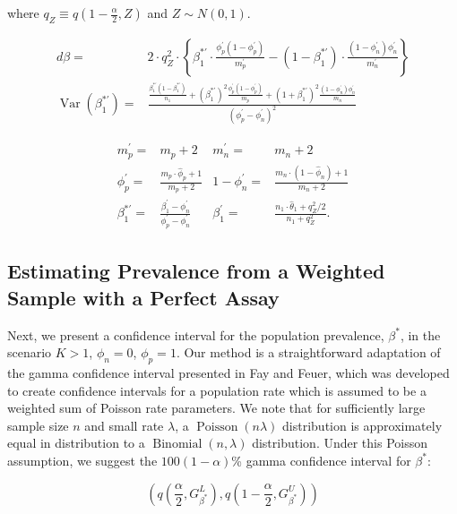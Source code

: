 \documentclass[AMA,STIX1COL]{WileyNJD-v2}
\DeclareMathOperator{\Var}{Var}
\begin{document}
where \( q_Z \equiv q\left( 1 - \frac{\alpha}{2}, Z \right)\) and \( Z \sim N(0,1) \).

\begin{align*}
    d\beta =& 2 \cdot q_Z^2 \cdot\left\{ \beta_1^{*\prime} \cdot \frac{\phi_p^\prime (1 - \phi_p^\prime)}{m_p^\prime} - (1 - \beta_1^{*\prime}) \cdot \frac{(1 - \phi_n^\prime) \phi_n^\prime}{m_n^\prime}  \right\}\\
    \Var(\beta_1^{*\prime}) =& \frac{ \frac{\beta_1^{*\prime}(1 - \beta_1^{*\prime})}{n_1} + \left(\beta_1^{*\prime}\right)^2 \frac{\phi_p^\prime (1 - \phi_p^\prime)}{m_p} + \left(1 + \beta_1^{*\prime}\right)^2 \frac{(1 - \phi_n^\prime) \phi_n^\prime}{ m_n}}{(\phi_p^\prime - \phi_n^\prime)^2}
\end{align*}

\begin{align*}
    m_p^\prime =& m_p +2 &
    m_n^\prime =& m_n + 2 \\
    \phi_p^\prime =& \frac{m_p \cdot \hat{\phi}_p + 1}{m_p + 2} &
   1 - \phi_n^\prime =& \frac{m_n \cdot (1 - \hat{\phi}_n) + 1}{m_n + 2} \\
   \beta_1^{*\prime} =& \frac{\beta_1^\prime - \phi_n^\prime}{\phi_p^\prime - \phi_n^\prime} &
    \beta_1^\prime =& \frac{n_1 \cdot \hat{\theta}_1 + q_Z^2 / 2}{n_1 + q_Z^2}.
\end{align*}

\subsection{Estimating Prevalence from a Weighted Sample with a Perfect Assay}
\label{sec:weight-perfect}

Next, we present a confidence interval for the population prevalence, \( \beta^* \), in the scenario \( K > 1 \), \( \phi_n = 0 \), \( \phi_p = 1 \).
Our method is a straightforward adaptation of the gamma confidence interval presented in Fay and Feuer\cite{FayF:1997}, which was developed to create confidence intervals for a population rate which is assumed to be a weighted sum of Poisson rate parameters.
We note that for sufficiently large sample size \( n \) and small rate \( \lambda \), a \( \operatorname{Poisson}(n\lambda) \) distribution is approximately equal in distribution to a \( \operatorname{Binomial}(n, \lambda) \) distribution.
Under this Poisson assumption, we suggest the \( 100(1 - \alpha) \)\% gamma confidence interval for \( \beta^* \):

\begin{equation}
    \left( q\left( \frac{\alpha}{2}, G_{\beta^*}^L \right), q \left( 1 - \frac{\alpha}{2},  G_{\beta^*}^U \right) \right)
\end{equation}
\end{document}
